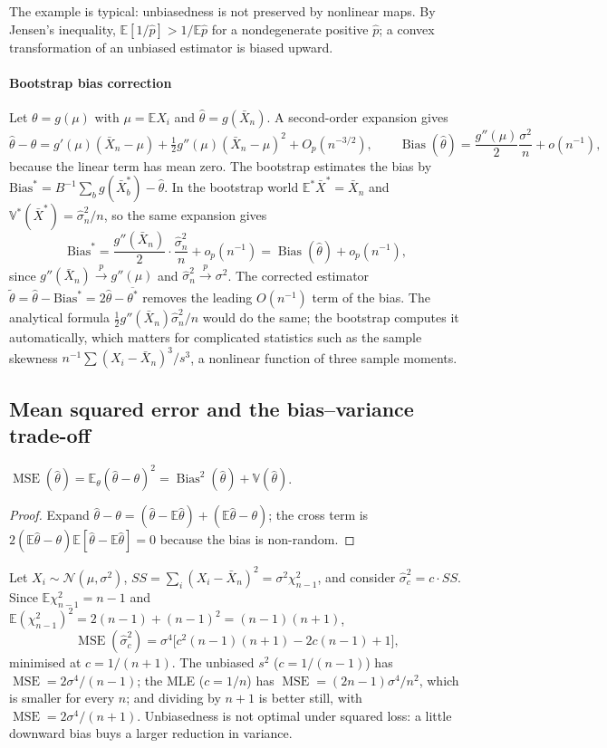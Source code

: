 \documentclass[11pt,a4paper]{article}
\newcommand{\E}{\mathbb{E}}
\newcommand{\V}{\mathbb{V}}
\newcommand{\N}{\mathcal{N}}
\newcommand{\Bias}{\operatorname{Bias}}
\newcommand{\MSE}{\operatorname{MSE}}
\newcommand{\cp}{\xrightarrow{\;p\;}}
\newcommand{\op}{o_p}
\newcommand{\Op}{O_p}
\newcommand{\Xbar}{\bar X_n}
\newcommand{\Estar}{\E^{*}}
\newcommand{\Vstar}{\V^{*}}
\begin{document}
The example is typical: unbiasedness is not preserved by nonlinear maps. By Jensen's inequality, $\E[1/\hat p]>1/\E\hat p$ for a nondegenerate positive $\hat p$; a convex transformation of an unbiased estimator is biased upward.

\paragraph{Bootstrap bias correction}
Let $\theta=g(\mu)$ with $\mu=\E X_i$ and $\hat\theta=g(\Xbar)$. A second-order expansion gives
\[
\hat\theta-\theta=g'(\mu)(\Xbar-\mu)+\tfrac12g''(\mu)(\Xbar-\mu)^2+\Op(n^{-3/2}),\qquad\Bias(\hat\theta)=\frac{g''(\mu)}{2}\frac{\sigma^2}{n}+o(n^{-1}),
\]
because the linear term has mean zero. The bootstrap estimates the bias by $\mathrm{Bias}^*=B^{-1}\sum_bg(\bar X_b^*)-\hat\theta$. In the bootstrap world $\Estar\bar X^*=\Xbar$ and $\Vstar(\bar X^*)=\hat\sigma^2_n/n$, so the same expansion gives
\[
\mathrm{Bias}^*=\frac{g''(\Xbar)}{2}\cdot\frac{\hat\sigma^2_n}{n}+\op(n^{-1})=\Bias(\hat\theta)+\op(n^{-1}),
\]
since $g''(\Xbar)\cp g''(\mu)$ and $\hat\sigma_n^2\cp\sigma^2$. The corrected estimator $\tilde\theta=\hat\theta-\mathrm{Bias}^*=2\hat\theta-\overline{\theta^*}$ removes the leading $O(n^{-1})$ term of the bias. The analytical formula $\frac12g''(\Xbar)\hat\sigma^2_n/n$ would do the same; the bootstrap computes it automatically, which matters for complicated statistics such as the sample skewness $n^{-1}\sum(X_i-\Xbar)^3/s^3$, a nonlinear function of three sample moments.

\subsection{Mean squared error and the bias--variance trade-off}

\begin{theorem}
$\MSE(\hat\theta)=\E_\theta(\hat\theta-\theta)^2=\Bias^2(\hat\theta)+\V(\hat\theta)$.
\end{theorem}

\begin{proof}
Expand $\hat\theta-\theta=(\hat\theta-\E\hat\theta)+(\E\hat\theta-\theta)$; the cross term is $2(\E\hat\theta-\theta)\E[\hat\theta-\E\hat\theta]=0$ because the bias is non-random.
\end{proof}

\begin{example}\label{ex:divisor}
Let $X_i\sim\N(\mu,\sigma^2)$, $SS=\sum_i(X_i-\Xbar)^2=\sigma^2\chi^2_{n-1}$, and consider $\hat\sigma^2_c=c\cdot SS$. Since $\E\chi^2_{n-1}=n-1$ and $\E(\chi^2_{n-1})^2=2(n-1)+(n-1)^2=(n-1)(n+1)$,
\[
\MSE(\hat\sigma_c^2)=\sigma^4\big[c^2(n-1)(n+1)-2c(n-1)+1\big],
\]
minimised at $c=1/(n+1)$. The unbiased $s^2$ ($c=1/(n-1)$) has $\MSE=2\sigma^4/(n-1)$; the MLE ($c=1/n$) has $\MSE=(2n-1)\sigma^4/n^2$, which is smaller for every $n$; and dividing by $n+1$ is better still, with $\MSE=2\sigma^4/(n+1)$. Unbiasedness is not optimal under squared loss: a little downward bias buys a larger reduction in variance.
\end{example}
\end{document}
